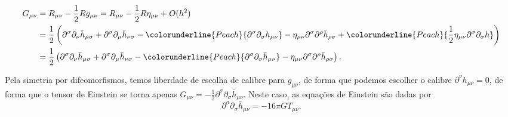 \begin{align*}
    G_{\mu\nu} &= R_{\mu\nu} - \frac12 Rg_{\mu\nu} = R_{\mu\nu} - \frac12 R \eta_{\mu\nu} + O(h^2)\\
               &= \frac12 \left(\partial^\sigma\partial_\nu \bar{h}_{\mu\sigma} + \partial^\sigma\partial_\mu \bar{h}_{\nu\sigma} - \colorunderline{Peach}{\partial^\sigma \partial_\sigma h_{\mu\nu}} -  \eta_{\mu\nu} \partial^\sigma\partial^\rho \bar{h}_{\rho\sigma} + \colorunderline{Peach}{\frac12 \eta_{\mu\nu}\partial^\sigma \partial_\sigma h}\right)\\
               &= \frac12 \left(\partial^\sigma\partial_\nu \bar{h}_{\mu\sigma} + \partial^\sigma\partial_\mu \bar{h}_{\nu\sigma} - \colorunderline{Peach}{\partial^\sigma \partial_\sigma \bar{h}_{\mu\nu}} -\eta_{\mu\nu} \partial^\sigma\partial^\rho \bar{h}_{\rho\sigma} \right).
\end{align*}

Pela simetria por difeomorfismos, temos liberdade de escolha de calibre para \(g_{\mu\nu}\), de forma que podemos escolher o calibre \(\partial^\nu h_{\mu\nu} = 0\), de forma que o tensor de Einstein se torna apenas \(G_{\mu\nu} = - \frac12 \partial^\sigma \partial_\sigma \bar{h}_{\mu\nu}\). Neste caso, as equações de Einstein são dadas por
\begin{equation*}
    \partial^\sigma\partial_\sigma \bar{h}_{\mu\nu} = - 16\pi GT_{\mu\nu}.
\end{equation*}

